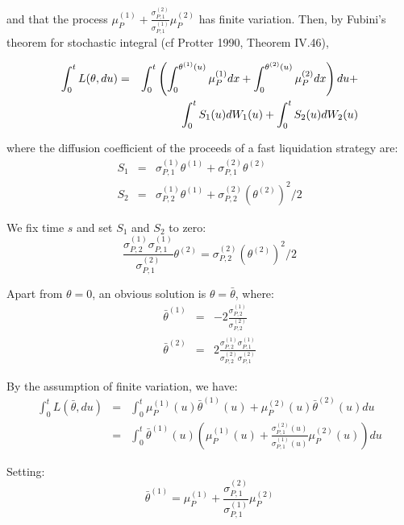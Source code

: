 \documentclass{article}
\begin{document}
and that the process $\mu _{P}^{(1)}+\frac{\sigma _{P,1}^{(2)}}{\sigma
_{P,1}^{(1)}}\mu _{P}^{(2)}$ has finite variation. Then, by Fubini's theorem
for stochastic integral (cf Protter 1990, Theorem IV.46),

\begin{eqnarray}
\int_{0}^{t}L(\theta ,du) &=&\int_{0}^{t}\left( \int_{0}^{\theta
^{(1)}(u)}\mu _{P}^{(1)}dx+\int_{0}^{\theta ^{(2)}(u)}\mu
_{P}^{(2)}dx\right) du+  \label{Lds} \\
&&\int_{0}^{t}S_{1}(u)dW_{1}(u)+\int_{0}^{t}S_{2}(u)dW_{2}(u)  \notag
\end{eqnarray}

where the diffusion coefficient of the proceeds of a fast liquidation
strategy are:%
\begin{eqnarray}
S_{1} &=&\sigma _{P,1}^{(1)}\theta ^{(1)}+\sigma _{P,1}^{(2)}\theta ^{(2)} \\
S_{2} &=&\sigma _{P,2}^{(1)}\theta ^{(1)}+\sigma _{P,2}^{(2)}(\theta
^{(2)})^{2}/2
\end{eqnarray}

We fix time $s$ and set $S_{1}$ and $S_{2}$ to zero:%
\begin{equation*}
\frac{\sigma _{P,2}^{(1)}\sigma _{P,1}^{(1)}}{\sigma _{P,1}^{(2)}}\theta
^{(2)}=\sigma _{P,2}^{(2)}(\theta ^{(2)})^{2}/2
\end{equation*}

Apart from $\theta =0$, an obvious solution is $\theta =\bar{\theta}$, where:%
\begin{eqnarray*}
\bar{\theta}^{(1)} &=&-2\frac{\sigma _{P,2}^{(1)}}{\sigma _{P,2}^{(2)}} \\
\bar{\theta}^{(2)} &=&2\frac{\sigma _{P,2}^{(1)}\sigma _{P,1}^{(1)}}{\sigma
_{P,2}^{(2)}\sigma _{P,1}^{(2)}}
\end{eqnarray*}

By the assumption of finite variation, we have:%
\begin{eqnarray*}
\int_{0}^{t}L(\bar{\theta},du) &=&\int_{0}^{t}\mu _{P}^{(1)}(u)\bar{\theta}%
^{(1)}(u)+\mu _{P}^{(2)}(u)\bar{\theta}^{(2)}(u)du \\
&=&\int_{0}^{t}\bar{\theta}^{(1)}(u)(\mu _{P}^{(1)}(u)+\frac{\sigma
_{P,1}^{(2)}(u)}{\sigma _{P,1}^{(1)}(u)}\mu _{P}^{(2)}(u))du
\end{eqnarray*}

Setting:%
\begin{equation*}
\bar{\theta}^{(1)}=\mu _{P}^{(1)}+\frac{\sigma _{P,1}^{(2)}}{\sigma
_{P,1}^{(1)}}\mu _{P}^{(2)}
\end{equation*}
\end{document}
